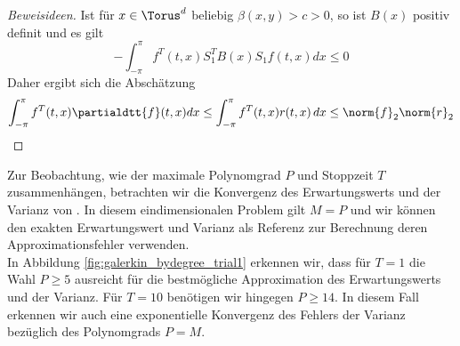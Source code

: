 \begin{proof}[Beweisideen]
Ist für $x\in\Torus^d$ beliebig $\beta(x,y)>c>0$, so ist $B(x)$ positiv definit und es gilt
\[-\int_{-\pi}^\pi f^T(t,x)S_1^TB(x)S_1f(t,x)dx\le 0\]
Daher ergibt sich die Abschätzung
\begin{equation}
\int_{-\pi}^\pi f^T(t,x)\partialdtt{f}(t,x)dx\le \int_{-\pi}^\pi f^T(t,x)r(t,x)\,dx\le \norm{f}_2\norm{r}_2 
\end{equation}
\end{proof}
Zur Beobachtung, wie der maximale Polynomgrad $P$ und Stoppzeit $T$ zusammenhängen, betrachten wir die Konvergenz des Erwartungswerts und der Varianz von . In diesem eindimensionalen Problem gilt $M=P$ und wir können den exakten Erwartungswert und Varianz als Referenz zur Berechnung deren Approximationsfehler verwenden.\\
In Abbildung \ref{fig:galerkin_bydegree_trial1} erkennen wir, dass für $T=1$ die Wahl $P\ge 5$ ausreicht für die bestmögliche Approximation des Erwartungswerts und der Varianz. Für $T=10$ benötigen wir hingegen $P\ge 14$. In diesem Fall erkennen wir auch eine exponentielle Konvergenz des Fehlers der Varianz bezüglich des Polynomgrads $P=M$.
